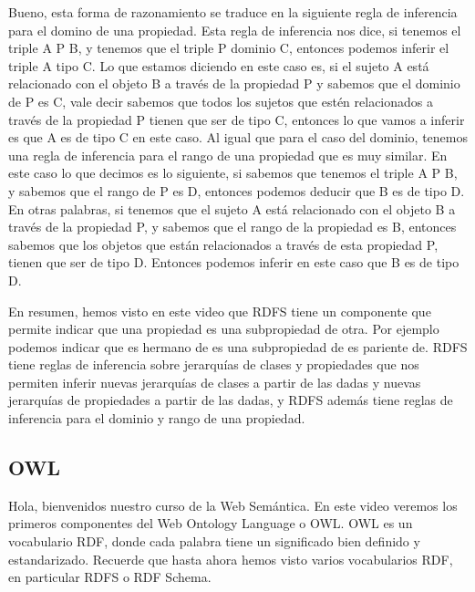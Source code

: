 Bueno, esta forma de razonamiento se traduce en la siguiente regla de inferencia para el domino de una propiedad. Esta regla de inferencia nos dice, si tenemos el triple A P B, y tenemos que el triple P dominio C, entonces podemos inferir el triple A tipo C. Lo que estamos diciendo en este caso es, si el sujeto A está relacionado con el objeto B a través de la propiedad P y sabemos que el dominio de P es C, vale decir sabemos que todos los sujetos que estén relacionados a través de la propiedad P tienen que ser de tipo C, entonces lo que vamos a inferir es que A es de tipo C en este caso. Al igual que para el caso del dominio, tenemos una regla de inferencia para el rango de una propiedad que es muy similar. En este caso lo que decimos es lo siguiente, si sabemos que tenemos el triple A P B, y sabemos que el rango de P es D, entonces podemos deducir que B es de tipo D. En otras palabras, si tenemos que el sujeto A está relacionado con el objeto B a través de la propiedad P, y sabemos que el rango de la propiedad es B, entonces sabemos que los objetos que están relacionados a través de esta propiedad P, tienen que ser de tipo D. Entonces podemos inferir en este caso que B es de tipo D.

En resumen, hemos visto en este video que RDFS tiene un componente que permite indicar que una propiedad es una subpropiedad de otra. Por ejemplo podemos indicar que es hermano de es una subpropiedad de es pariente de. RDFS tiene reglas de inferencia sobre jerarquías de clases y propiedades que nos permiten inferir nuevas jerarquías de clases a partir de las dadas y nuevas jerarquías de propiedades a partir de las dadas, y RDFS además tiene reglas de inferencia para el dominio y rango de una propiedad.

\subsection{OWL}

Hola, bienvenidos nuestro curso de la Web Semántica. En este video veremos los primeros componentes del Web Ontology Language o OWL. OWL es un vocabulario RDF, donde cada palabra tiene un significado bien definido y estandarizado. Recuerde que hasta ahora hemos visto varios vocabularios RDF, en particular RDFS o RDF Schema.

